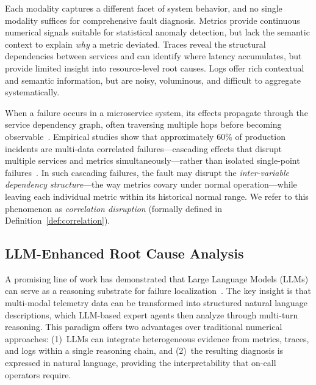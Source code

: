 \documentclass[a4paper,fleqn]{cas-dc}
\begin{document}
Each modality captures a different facet of system behavior, and no single modality suffices for comprehensive fault diagnosis.  Metrics provide continuous numerical signals suitable for statistical anomaly detection, but lack the semantic context to explain \emph{why} a metric deviated.  Traces reveal the structural dependencies between services and can identify where latency accumulates, but provide limited insight into resource-level root causes.  Logs offer rich contextual and semantic information, but are noisy, voluminous, and difficult to aggregate systematically.

When a failure occurs in a microservice system, its effects propagate through the service dependency graph, often traversing multiple hops before becoming observable~\cite{10.1145/3715005}.  Empirical studies show that approximately 60\% of production incidents are multi-data correlated failures---cascading effects that disrupt multiple services and metrics simultaneously---rather than isolated single-point failures~\cite{10.1145/3542929.3563482}.  In such cascading failures, the fault may disrupt the \emph{inter-variable dependency structure}---the way metrics covary under normal operation---while leaving each individual metric within its historical normal range.  We refer to this phenomenon as \emph{correlation disruption} (formally defined in Definition~\ref{def:correlation}).

\subsection{LLM-Enhanced Root Cause Analysis}

A promising line of work has demonstrated that Large Language Models (LLMs) can serve as a reasoning substrate for failure localization~\cite{11449471,10.1145/3627703.3629553,10.1145/3627673.3680016}.  The key insight is that multi-modal telemetry data can be transformed into structured natural language descriptions, which LLM-based expert agents then analyze through multi-turn reasoning.  This paradigm offers two advantages over traditional numerical approaches: (1)~LLMs can integrate heterogeneous evidence from metrics, traces, and logs within a single reasoning chain, and (2)~the resulting diagnosis is expressed in natural language, providing the interpretability that on-call operators require.
\end{document}
